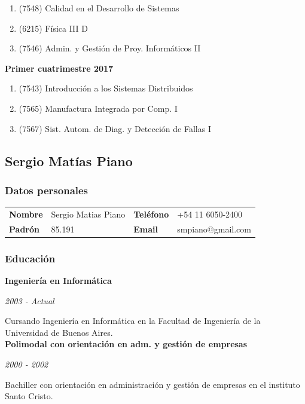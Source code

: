 \documentclass[a4paper,11pt]{article}
\begin{document}
\begin{enumerate}
  \item (7548) Calidad en el Desarrollo de Sistemas
  \item (6215) Física III D
  \item (7546) Admin. y Gestión de Proy. Informáticos II
\end{enumerate}

\textbf{Primer cuatrimestre 2017}

\begin{enumerate}
  \item (7543) Introducción a los Sistemas Distribuidos
  \item (7565) Manufactura Integrada por Comp. I
  \item (7567) Sist. Autom. de Diag. y Detección de Fallas I
\end{enumerate}

\subsection{Sergio Matías Piano}

\subsubsection{Datos personales}

\noindent \begin{tabular}{l l l l}
  \textbf{Nombre} & Sergio Matias Piano  & \textbf{Teléfono} & +54 11 6050-2400\\
  \textbf{Padrón} & 85.191               & \textbf{Email}    & smpiano@gmail.com \\
\end{tabular}

\subsubsection{Educación}

\noindent \textbf{Ingeniería en Informática}

\noindent\emph{2003 - Actual}

\noindent Cursando Ingeniería en Informática en la Facultad de Ingeniería de la
Universidad de Buenos Aires. \\

\noindent \textbf{Polimodal con orientación en adm. y gestión de empresas}

\noindent\emph{2000 - 2002}

\noindent Bachiller con orientación en administración y gestión de empresas en
el instituto Santo Cristo.
\end{document}

